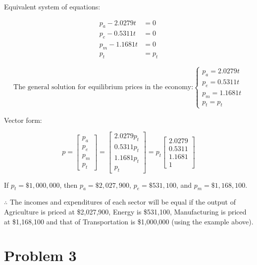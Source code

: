 \documentclass[12pt, a4paper]{article}
\begin{document}
Equivalent system of equations:

\[
    \begin{aligned}
        p_a - 2.0279t &= 0 \\
        p_e - 0.5311t &= 0 \\
        p_m - 1.1681t &= 0 \\
        p_t &= p_t
    \end{aligned}
\]

\[
    \text{The general solution for equilibrium prices in the economy:} \begin{cases}
        p_a = 2.0279t \\
        p_e = 0.5311t \\
        p_m = 1.1681t \\
        p_t = p_t
    \end{cases}
\]

Vector form:

\[
   p = \begin{bmatrix}
       p_a \\
        p_e \\
        p_m \\
        p_t
    \end{bmatrix} = \begin{bmatrix}
        2.0279p_t \\
        0.5311p_t \\
        1.1681p_t \\
        p_t
    \end{bmatrix} = p_t \begin{bmatrix}
        2.0279 \\
        0.5311 \\
        1.1681 \\
        1
    \end{bmatrix}
\]

If $p_t = \$1,000,000$, then $p_a = \$2,027,900$, $p_e = \$531,100$, and $p_m = \$1,168,100$.

$\therefore$ The incomes and expenditures of each sector will be equal if the output of Agriculture is priced at \$2,027,900, Energy is \$531,100, Manufacturing is priced at \$1,168,100 and that of Transportation is \$1,000,000 (using the example above).

\newpage

\section*{Problem 3}
\end{document}
